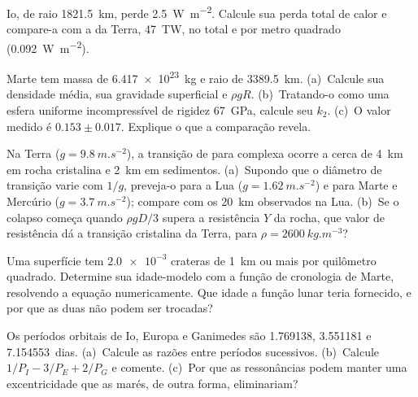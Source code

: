 \begin{exercise}[$\star$]\label{exo:b3:planetary-interiors-surfaces:4}
Io, de raio \qty{1821.5}{km}, perde \qty{2.5}{W.m^{-2}}. Calcule sua
perda total de calor e compare-a com a da Terra, \qty{47}{TW}, no total e
por metro quadrado (\qty{0.092}{W.m^{-2}}).
\end{exercise}

\begin{exercise}[$\star\star$]\label{exo:b3:planetary-interiors-surfaces:5}
Marte tem massa de \qty{6.417e23}{kg} e raio de \qty{3389.5}{km}.
(a)~Calcule sua densidade média, sua gravidade superficial e $\rho gR$.
(b)~Tratando-o como uma esfera uniforme incompressível de rigidez
\qty{67}{GPa}, calcule seu  $k_2$. (c)~O valor medido é
$0.153 \pm 0.017$. Explique o que a comparação revela.
\end{exercise}

\begin{exercise}[$\star\star$]\label{exo:b3:planetary-interiors-surfaces:6}
Na Terra ($g = \qty{9.8}{m.s^{-2}}$), a transição de  para
complexa ocorre a cerca de \qty{4}{km} em rocha cristalina e \qty{2}{km} em
sedimentos. (a)~Supondo que o diâmetro de transição varie com $1/g$,
preveja-o para a Lua ($g = \qty{1.62}{m.s^{-2}}$) e para Marte e
Mercúrio ($g = \qty{3.7}{m.s^{-2}}$); compare com os \qty{20}{km}
observados na Lua. (b)~Se o colapso começa quando $\rho gD/3$ supera a
resistência $Y$ da rocha, que valor de resistência dá a transição
cristalina da Terra, para $\rho = \qty{2600}{kg.m^{-3}}$?
\end{exercise}

\begin{exercise}[$\star\star$]\label{exo:b3:planetary-interiors-surfaces:7}
Uma superfície tem $\num{2.0e-3}$ crateras de \qty{1}{km} ou mais por
quilômetro quadrado. Determine sua idade-modelo com a função de cronologia de Marte,
resolvendo a equação numericamente. Que idade a função lunar teria fornecido,
e por que as duas não podem ser trocadas?
\end{exercise}

\begin{exercise}[$\star\star$]\label{exo:b3:planetary-interiors-surfaces:8}
Os períodos orbitais de Io, Europa e Ganimedes são 1.769138, 3.551181 e
\num{7.154553}~dias. (a)~Calcule as razões entre períodos sucessivos.
(b)~Calcule $1/P_I - 3/P_E + 2/P_G$ e comente. (c)~Por que as ressonâncias podem
manter uma excentricidade que as marés, de outra forma, eliminariam?
\end{exercise}

